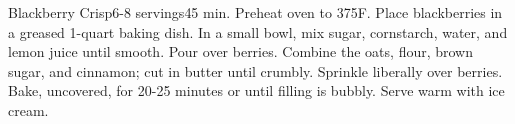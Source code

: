 \begin{recipe}{Blackberry Crisp}{6-8 servings}{45 min.}
  Preheat oven to 375\0F. Place blackberries in a greased 1-quart baking dish.
  In a small bowl, mix sugar, cornstarch, water, and lemon juice until smooth.
  Pour over berries.
  Combine the oats, flour, brown sugar, and cinnamon; cut in butter until
  crumbly. Sprinkle liberally over berries.
  Bake, uncovered, for 20-25 minutes or until filling is bubbly. Serve warm
  with ice cream.
\end{recipe}
